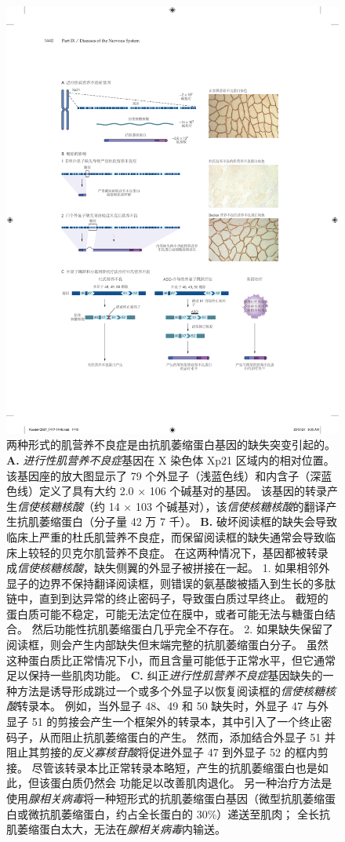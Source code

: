 \begin{figure}[htbp]
	\centering
	\includegraphics[width=0.84\linewidth]{chap57/fig_57_10}
	\caption{两种形式的肌营养不良症是由抗肌萎缩蛋白基因的缺失突变引起的\cite{hoffman1987dystrophin}。
		\textbf{A.} \textit{进行性肌营养不良症}基因在 X 染色体 Xp21 区域内的相对位置。
		该基因座的放大图显示了 79 个外显子（浅蓝色线）和内含子（深蓝色线）定义了具有大约 2.0 × 106 个碱基对的基因。
		该基因的转录产生\textit{信使核糖核酸}（约 14 × 103 个碱基对），该\textit{信使核糖核酸}的翻译产生抗肌萎缩蛋白（分子量 42 万 7 千）。
		\textbf{B.} 破坏阅读框的缺失会导致临床上严重的杜氏肌营养不良症，而保留阅读框的缺失通常会导致临床上较轻的贝克尔肌营养不良症。
		在这两种情况下，基因都被转录成\textit{信使核糖核酸}，缺失侧翼的外显子被拼接在一起。
		1. 如果相邻外显子的边界不保持翻译阅读框，则错误的氨基酸被插入到生长的多肽链中，直到到达异常的终止密码子，导致蛋白质过早终止。
		截短的蛋白质可能不稳定，可能无法定位在膜中，或者可能无法与糖蛋白结合。
		然后功能性抗肌萎缩蛋白几乎完全不存在。
		2. 如果缺失保留了阅读框，则会产生内部缺失但末端完整的抗肌萎缩蛋白分子。
		虽然这种蛋白质比正常情况下小，而且含量可能低于正常水平，但它通常足以保持一些肌肉功能。
		\textbf{C.} 纠正\textit{进行性肌营养不良症}基因缺失的一种方法是诱导形成跳过一个或多个外显子以恢复阅读框的\textit{信使核糖核酸}转录本。
		例如，当外显子 48、49 和 50 缺失时，外显子 47 与外显子 51 的剪接会产生一个框架外的转录本，其中引入了一个终止密码子，从而阻止抗肌萎缩蛋白的产生。
		然而，添加结合外显子 51 并阻止其剪接的\textit{反义寡核苷酸}将促进外显子 47 到外显子 52 的框内剪接。
		尽管该转录本比正常转录本略短，产生的抗肌萎缩蛋白也是如此，但该蛋白质仍然会 功能足以改善肌肉退化。
		另一种治疗方法是使用\textit{腺相关病毒}将一种短形式的抗肌萎缩蛋白基因（微型抗肌萎缩蛋白或微抗肌萎缩蛋白，约占全长蛋白的 30\%）递送至肌肉；
		全长抗肌萎缩蛋白太大，无法在\textit{腺相关病毒}内输送。}
	\label{fig:57_10}
\end{figure}


